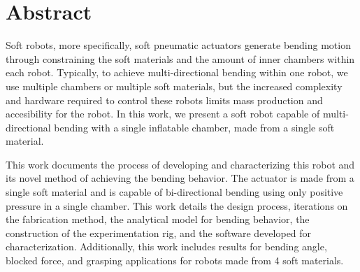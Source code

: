 \section*{Abstract}
Soft robots, more specifically, soft pneumatic actuators generate bending motion through constraining the soft materials and the amount of inner chambers within each robot. Typically, to achieve multi-directional bending within one robot, we use multiple chambers or multiple soft materials, but the increased complexity and hardware required to control these robots limits mass production and accesibility for the robot. In this work, we present a soft robot capable of multi-directional bending with a single inflatable chamber, made from a single soft material. 

This work documents the process of developing and characterizing this robot and its novel method of achieving the bending behavior. The actuator is made from a single soft material and is capable of bi-directional bending using only positive pressure in a single chamber. This work details the design process, iterations on the fabrication method, the analytical model for bending behavior, the construction of the experimentation rig, and the software developed for characterization. Additionally, this work includes results for bending angle, blocked force, and grasping applications for robots made from 4 soft materials. 